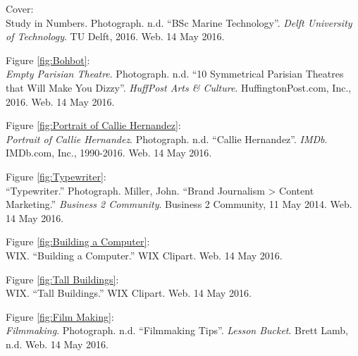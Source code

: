 \newpage 
{}
\begin{imagescited} 
\begin{flushleft}
\linespread{1.5}

Cover: \\
\bibent
Study in Numbers. Photograph. n.d. “BSc Marine Technology”. \textit{Delft University of Technology}. TU Delft, 2016. Web. 14 May 2016. \\ \vspace{3mm}

Figure \ref{fig:Bohbot}: \\
\bibent
\textit{Empty Parisian Theatre}. Photograph. n.d. “10 Symmetrical Parisian Theatres that Will Make You Dizzy”. \textit{HuffPost Arts \& Culture}. HuffingtonPost.com, Inc., 2016. Web. 14 May 2016. \\ \vspace{3mm}

Figure \ref{fig:Portrait of Callie Hernandez}: \\
\bibent
\textit{Portrait of Callie Hernandez}. Photograph. n.d. “Callie Hernandez”. \textit{IMDb}. IMDb.com, Inc., 1990-2016. Web. 14 May 2016. \\ \vspace{3mm}

Figure \ref{fig:Typewriter}: \\
\bibent
“Typewriter.” Photograph. Miller, John. “Brand Journalism > Content Marketing.” \textit{Business 2 Community}. Business 2 Community, 11 May 2014. Web. 14 May 2016. \\ \vspace{3mm}

Figure \ref{fig:Building a Computer}: \\
\bibent
WIX. “Building a Computer.” WIX Clipart. Web. 14 May 2016. \\ \vspace{3mm}

Figure \ref{fig:Tall Buildings}: \\
\bibent
WIX. “Tall Buildings.” WIX Clipart. Web. 14 May 2016. \\ \vspace{3mm}

Figure \ref{fig:Film Making}: \\
\bibent
\textit{Filmmaking}. Photograph. n.d. “Filmmaking Tips”. \textit{Lesson Bucket}. Brett Lamb, n.d. Web. 14 May 2016. \\ \vspace{3mm}


\end{flushleft}
\end{imagescited}
